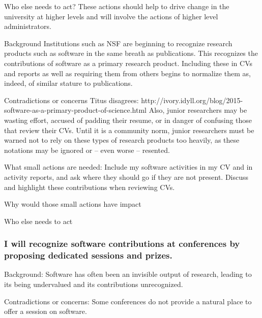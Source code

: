 \documentclass[a4paper,UKenglish]{dagman}
\renewcommand{\paragraph}[1]{\subsubsection*{#1}\xspace}
\begin{document}
Who else needs to act?
These actions should help to drive change in the university at higher levels and will involve the actions of higher level administrators.




Background
Institutions such as NSF are beginning to recognize research products such as software in the same breath as publications. This recognizes the contributions of software as a primary research product. Including these in CVs and reports as well as requiring them from others begins to normalize them as, indeed, of similar stature to publications. 

Contradictions or concerns
Titus disagrees: http://ivory.idyll.org/blog/2015-software-as-a-primary-product-of-science.html
Also, junior researchers may be wasting effort, accused of padding their resume, or in danger of confusing those that review their CVs. Until it is a community norm, junior researchers must be warned not to rely on these types of research products too heavily, as these notations may be ignored or -- even worse -- resented.

What small actions are needed: 
Include my software activities in my CV and in activity reports, and ask where they should go if they are not present. Discuss and highlight these contributions when reviewing CVs.

Why would those small actions have impact


Who else needs to act




\paragraph{I will recognize software contributions at conferences by proposing dedicated sessions and prizes.}


Background: Software has often been an invisible output of research, leading to its being undervalued and its contributions unrecognized.

Contradictions or concerns: Some conferences do not provide a natural place to offer a session on software. 
\end{document}
